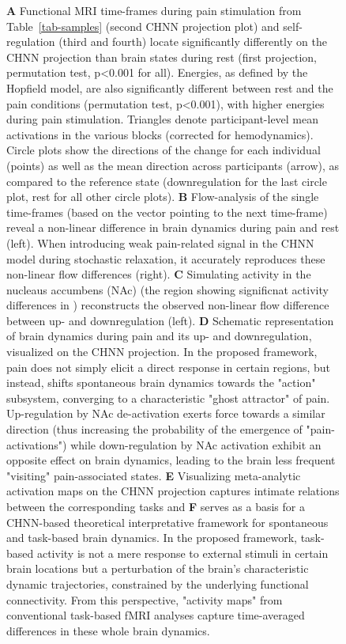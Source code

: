 \documentclass{article}
\begin{document}
\begin{figure}[!htbp]
{\textbf{A} Functional MRI time-frames during pain stimulation from Table~\ref{tab-samples} (second CHNN projection plot)
and self-regulation (third and fourth) locate significantly differently on the CHNN projection than brain states
during rest (first projection, permutation test, p\textless 0.001 for all).  Energies, as defined by the Hopfield model, are also
significantly different between rest and the pain conditions (permutation test, p\textless 0.001), with higher energies during
pain stimulation. Triangles denote participant-level mean activations in the various blocks (corrected for
hemodynamics). Circle plots show the directions of the change for each individual (points) as well as the mean direction
across participants (arrow), as compared to the reference state (downregulation for the last circle plot, rest for all
other circle plots).
\textbf{B} Flow-analysis of the single time-frames (based on the vector pointing to the next time-frame)
reveal a non-linear difference in brain dynamics during pain and rest (left). When introducing weak
pain-related signal in the CHNN model during stochastic relaxation, it accurately reproduces these non-linear flow
differences (right).
\textbf{C} Simulating activity in the nucleaus accumbens (NAc) (the region showing significnat activity differences in \cite{woo2015distinct}) reconstructs the observed non-linear flow difference between up- and downregulation (left).
\textbf{D} Schematic representation of brain dynamics during pain and its up- and downregulation, visualized on the CHNN
projection. In the proposed framework, pain does not simply elicit a direct response in certain regions, but instead, shifts spontaneous brain dynamics towards the "action" subsystem, converging to a characteristic "ghost
attractor" of pain. Up-regulation by NAc de-activation exerts force towards a similar direction (thus increasing the probability of the emergence of "pain-activations") while down-regulation
by NAc activation exhibit an opposite effect on brain dynamics, leading to the brain less frequent "visiting"
pain-associated states.
\textbf{E} Visualizing meta-analytic activation maps on the CHNN projection captures intimate relations between the corresponding tasks and \textbf{F} serves as a basis for a CHNN-based theoretical interpretative framework for spontaneous and task-based brain dynamics. In the proposed framework, task-based activity is not a mere response to external stimuli in certain brain locations but a perturbation of the brain's characteristic dynamic trajectories, constrained by the underlying functional connectivity. From this perspective, "activity maps" from conventional task-based fMRI analyses capture time-averaged differences in these whole brain dynamics.}
\label{task-validity}
\end{figure}
\end{document}
